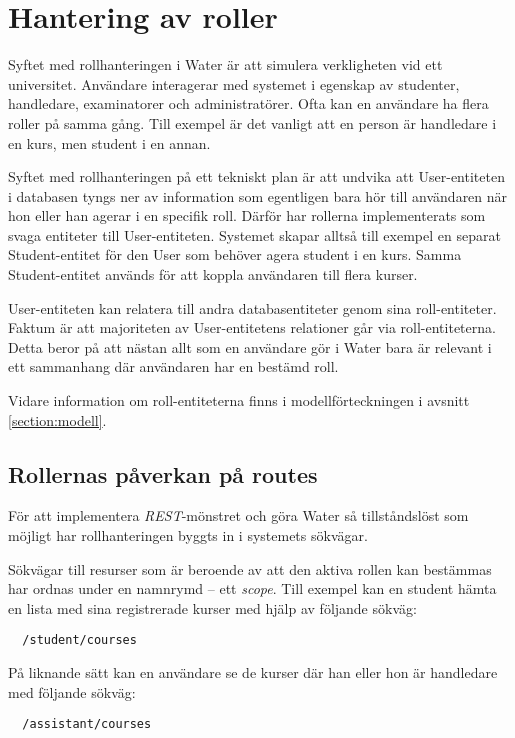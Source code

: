 \section{Hantering av roller}

Syftet med rollhanteringen i Water är att simulera verkligheten vid ett universitet. Användare interagerar med systemet i egenskap av studenter, handledare, examinatorer och administratörer. Ofta kan en användare ha flera roller på samma gång. Till exempel är det vanligt att en person är handledare i en kurs, men student i en annan. 

Syftet med rollhanteringen på ett tekniskt plan är att undvika att User-entiteten i databasen tyngs ner av information som egentligen bara hör till användaren när hon eller han agerar i en specifik roll. Därför har rollerna implementerats som svaga entiteter till User-entiteten. Systemet skapar alltså till exempel en separat Student-entitet för den User som behöver agera student i en kurs. Samma Student-entitet används för att koppla användaren till flera kurser.

User-entiteten kan relatera till andra databasentiteter genom sina roll-entiteter. 
Faktum är att majoriteten av User-entitetens relationer går via roll-entiteterna. Detta beror på att nästan allt som en användare gör i Water bara är relevant i ett sammanhang där användaren har en bestämd roll.

Vidare information om roll-entiteterna finns i modellförteckningen i avsnitt \ref{section:modell}.

\subsection{Rollernas påverkan på routes}
För att implementera \emph{REST}-mönstret och göra Water så tillståndslöst som möjligt har rollhanteringen byggts in i systemets sökvägar.

Sökvägar till resurser som är beroende av att den aktiva rollen kan bestämmas har ordnas under en namnrymd – ett \emph{scope}.
Till exempel kan en student hämta en lista med sina registrerade kurser med hjälp av följande sökväg:

\begin{BVerbatim}
  /student/courses
\end{BVerbatim}

På liknande sätt kan en användare se de kurser där han eller hon är handledare med följande sökväg:

\begin{BVerbatim}
  /assistant/courses
\end{BVerbatim}

